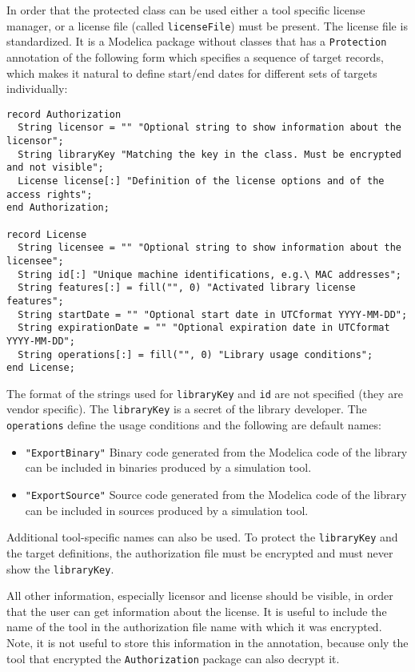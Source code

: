 In order that the protected class can be used either a tool specific license manager, or a license file (called \lstinline!licenseFile!) must be present.
The license file is standardized.
It is a Modelica package without classes that has a \lstinline!Protection! annotation of the following form which specifies a sequence of target records, which makes it natural to define start/end dates for different sets of targets individually:
\begin{lstlisting}[language=modelica]
record Authorization
  String licensor = "" "Optional string to show information about the licensor";
  String libraryKey "Matching the key in the class. Must be encrypted and not visible";
  License license[:] "Definition of the license options and of the access rights";
end Authorization;

record License
  String licensee = "" "Optional string to show information about the licensee";
  String id[:] "Unique machine identifications, e.g.\ MAC addresses";
  String features[:] = fill("", 0) "Activated library license features";
  String startDate = "" "Optional start date in UTCformat YYYY-MM-DD";
  String expirationDate = "" "Optional expiration date in UTCformat YYYY-MM-DD";
  String operations[:] = fill("", 0) "Library usage conditions";
end License;
\end{lstlisting}%

The format of the strings used for \lstinline!libraryKey! and \lstinline!id! are not specified
(they are vendor specific). The \lstinline!libraryKey! is a secret of the library
developer. The \lstinline!operations! define the usage conditions and the following
are default names:
\begin{itemize}
\item
  \lstinline!"ExportBinary"! Binary code generated from the Modelica code of the
  library can be included in binaries produced by a simulation
  tool.
\item
  \lstinline!"ExportSource"! Source code generated from the Modelica code of the
  library can be included in sources produced by a simulation tool.
\end{itemize}

Additional tool-specific names can also be used. To protect the
\lstinline!libraryKey! and the target definitions, the authorization file must
be encrypted and must never show the \lstinline!libraryKey!.

\begin{nonnormative}
All other information, especially licensor and license should be visible, in order
that the user can get information about the license. It is useful to
include the name of the tool in the authorization file name with which
it was encrypted. Note, it is not useful to store this information in
the annotation, because only the tool that encrypted the \lstinline!Authorization!
package can also decrypt it.
\end{nonnormative}

